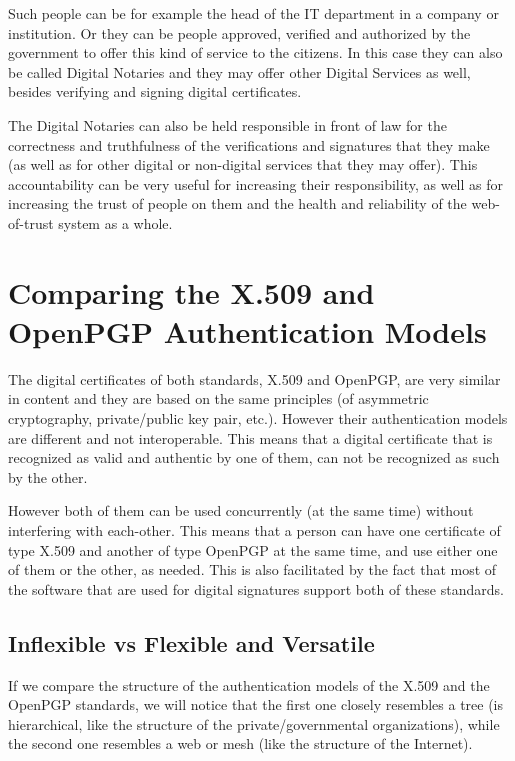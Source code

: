 \documentclass[a4paper]{article}
\begin{document}
Such people can be for example the head of the IT department in a
company or institution. Or they can be people approved, verified and
authorized by the government to offer this kind of service to the
citizens. In this case they can also be called Digital Notaries
and they may offer other Digital Services as well, besides verifying
and signing digital certificates.

The Digital Notaries can also be held responsible in front of law for
the correctness and truthfulness of the verifications and signatures
that they make (as well as for other digital or non-digital services
that they may offer). This accountability can be very useful for
increasing their responsibility, as well as for increasing the trust
of people on them and the health and reliability of the web-of-trust
system as a whole.

\section{Comparing the X.509 and OpenPGP Authentication Models}

The digital certificates of both standards, X.509 and OpenPGP, are
very similar in content and they are based on the same principles (of
asymmetric cryptography, private/public key pair, etc.). However their
authentication models are different and not interoperable. This means
that a digital certificate that is recognized as valid and authentic
by one of them, can not be recognized as such by the other.

However both of them can be used concurrently (at the same time)
without interfering with each-other. This means that a person can have
one certificate of type X.509 and another of type OpenPGP at the same
time, and use either one of them or the other, as needed.  This is
also facilitated by the fact that most of the software that are used
for digital signatures support both of these standards.

\subsection{Inflexible vs Flexible and Versatile}

If we compare the structure of the authentication models of the X.509
and the OpenPGP standards, we will notice that the first one closely
resembles a tree (is hierarchical, like the structure of the
private/governmental organizations), while the second one resembles a
web or mesh (like the structure of the Internet).
\end{document}
